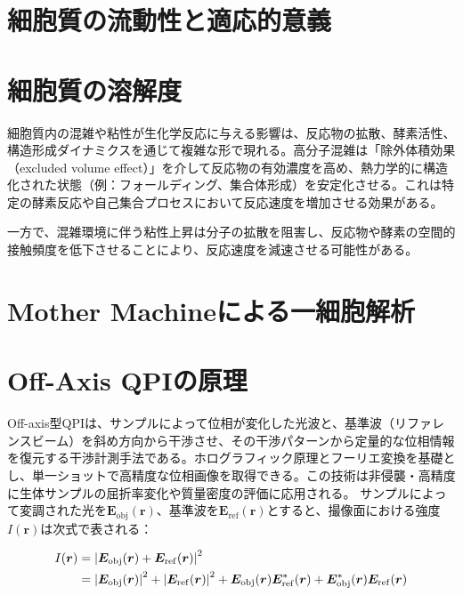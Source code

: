 \section{細胞質の流動性と適応的意義}
\cite{persson2020viscoadaptation}
\section{細胞質の溶解度}
細胞質内の混雑や粘性が生化学反応に与える影響は、反応物の拡散、酵素活性、構造形成ダイナミクスを通じて複雑な形で現れる。高分子混雑は「除外体積効果（excluded volume effect）」を介して反応物の有効濃度を高め、熱力学的に構造化された状態（例：フォールディング、集合体形成）を安定化させる。これは特定の酵素反応や自己集合プロセスにおいて反応速度を増加させる効果がある。

一方で、混雑環境に伴う粘性上昇は分子の拡散を阻害し、反応物や酵素の空間的接触頻度を低下させることにより、反応速度を減速させる可能性がある。
\section{Mother Machineによる一細胞解析}
\section{}
\section{Off-Axis QPIの原理}
Off-axis型QPIは、サンプルによって位相が変化した光波と、基準波（リファレンスビーム）を斜め方向から干渉させ、その干渉パターンから定量的な位相情報を復元する干渉計測手法である。ホログラフィック原理とフーリエ変換を基礎とし、単一ショットで高精度な位相画像を取得できる。この技術は非侵襲・高精度に生体サンプルの屈折率変化や質量密度の評価に応用される。
サンプルによって変調された光を$\bm{E}_{\mathrm{obj}}(\bm{r})$、基準波を$\bm{E}_{\mathrm{ref}}(\bm{r})$とすると、撮像面における強度$I(\bm{r})$は次式で表される：

\begin{align}
I(\bm{r}) &= \abs{\bm{E}_{\mathrm{obj}}(\bm{r}) + \bm{E}_{\mathrm{ref}}(\bm{r})}^2 \\
&= \abs{\bm{E}_{\mathrm{obj}}(\bm{r})}^2 + \abs{\bm{E}_{\mathrm{ref}}(\bm{r})}^2 + \bm{E}_{\mathrm{obj}}(\bm{r}) \bm{E}_{\mathrm{ref}}^*(\bm{r}) + \bm{E}_{\mathrm{obj}}^*(\bm{r}) \bm{E}_{\mathrm{ref}}(\bm{r})
\end{align}

